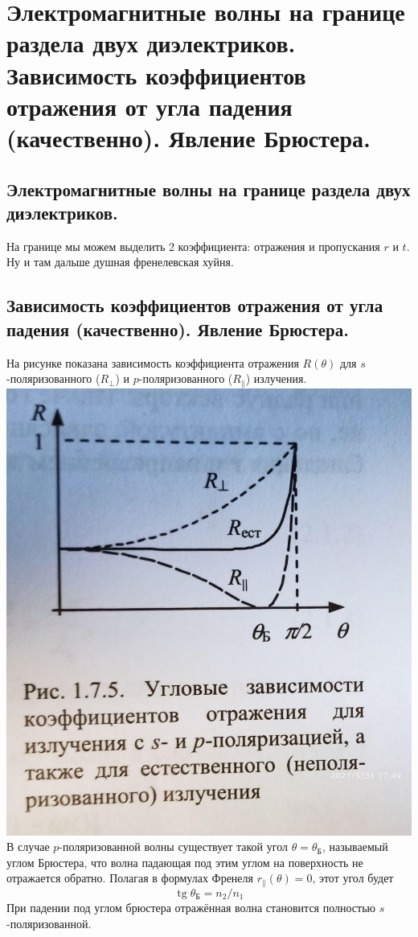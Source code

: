 \section{Электромагнитные волны на границе раздела двух диэлектриков. Зависимость коэффициентов отражения от угла падения (качественно). Явление Брюстера.}
\subsection{Электромагнитные волны на границе раздела двух диэлектриков. }
На границе мы можем выделить 2 коэффициента: отражения и пропускания $r$ и $t$. Ну и там дальше душная френелевская хуйня.
\subsection{Зависимость коэффициентов отражения от угла падения (качественно). Явление Брюстера.}
На рисунке показана зависимость коэффициента отражения $R(\theta)$ для $s$-поляризованного ($R_{\perp}$) и $p$-поляризованного ($R_{\parallel}$) излучения.\\
\includegraphics[width=\textwidth]{parts/img/p5_kach.jpg}\\
В случае $p$-поляризованной волны существует такой угол $\theta = \theta_Б$, называемый углом Брюстера, что волна падающая под этим углом на поверхность не отражается обратно. Полагая в формулах Френеля $r_{\parallel}(\theta) = 0$, этот угол будет
$$\operatorname{tg} \theta_Б = n_2/n_1$$
При падении под углом брюстера отражённая волна становится полностью $s$-поляризованной.
